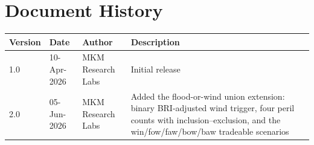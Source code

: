 \documentclass[11pt,a4paper]{article}
\begin{document}
\section*{Document History}

\begin{tabular}{llll}
\toprule
\textbf{Version} & \textbf{Date} & \textbf{Author} & \textbf{Description} \\
\midrule
1.0 & 10-Apr-2026 & MKM Research Labs & Initial release \\
2.0 & 05-Jun-2026 & MKM Research Labs & Added the flood-or-wind union extension: binary BRI-adjusted wind trigger, four peril counts with inclusion--exclusion, and the win/fow/faw/bow/baw tradeable scenarios \\
\bottomrule
\end{tabular}
\end{document}
